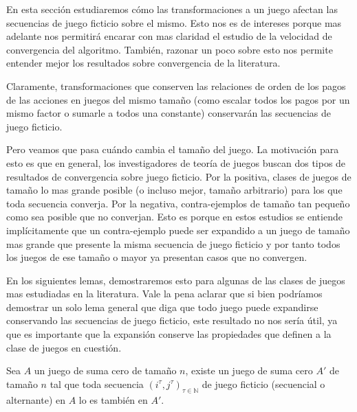 En esta sección estudiaremos cómo las transformaciones a un juego afectan las secuencias de juego ficticio sobre el mismo. Esto nos es de intereses porque mas adelante nos permitirá encarar con mas claridad el estudio de la velocidad de convergencia del algoritmo. También, razonar un poco sobre esto nos permite entender mejor los resultados sobre convergencia de la literatura.

Claramente, transformaciones que conserven las relaciones de orden de los pagos de las acciones en juegos del mismo tamaño (como escalar todos los pagos por un mismo factor o sumarle a todos una constante) conservarán las secuencias de juego ficticio.

Pero veamos que pasa cuándo cambia el tamaño del juego. La motivación para esto es que en general, los investigadores de teoría de juegos buscan dos tipos de resultados de convergencia sobre juego ficticio. Por la positiva, clases de juegos de tamaño lo mas grande posible (o incluso mejor, tamaño arbitrario) para los que toda secuencia converja. Por la negativa, contra-ejemplos de tamaño tan pequeño como sea posible que no converjan. Esto es porque en estos estudios se entiende implícitamente que un contra-ejemplo puede ser expandido a un juego de tamaño mas grande que presente la misma secuencia de juego ficticio y por tanto todos los juegos de ese tamaño o mayor ya presentan casos que no convergen.

En los siguientes lemas, demostraremos esto para algunas de las clases de juegos mas estudiadas en la literatura. Vale la pena aclarar que si bien podríamos demostrar un solo lema general que diga que todo juego puede expandirse conservando las secuencias de juego ficticio, este resultado no nos sería útil, ya que es importante que la expansión conserve las propiedades que definen a la clase de juegos en cuestión.

\begin{lemma}
    Sea $A$ un juego de suma cero de tamaño $n$, existe un juego  de suma cero $A'$ de tamaño $n$ tal que toda secuencia $(i^\tau, j^\tau)_{\tau \in \mathbb{N}}$ de juego ficticio (secuencial o alternante) en $A$ lo es también en $A'$.
\end{lemma}

